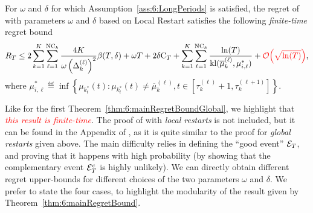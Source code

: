 \begin{theorem}\label{thm:6:mainRegretBound}
\begin{leftbar}[theorembar]  %
    For $\omega$ and $\delta$ for which Assumption~\ref{ass:6:LongPeriods} is satisfied, the regret of \GLRklUCB{} with parameters $\omega$ and $\delta$ based on Local Restart satisfies the following \emph{finite-time} regret bound
    \begin{equation}
        R_T \leq 2\sum_{k=1}^K\sum_{\ell=1}^{\text{NC}_k} \frac{4K}{\omega \left(\Delta_k^{(\ell)}\right)^2}\beta(T,\delta) +\omega T + 2 \delta \mathrm{C}_T  + \sum_{k=1}^K\sum_{\ell=1}^{\text{NC}_k} \frac{\ln(T)}{\mathrm{kl}(\overline{\mu}_k^{(\ell)},{\mu}^*_{i,\ell})} + \textcolor{red}{\mathop{}\mathopen{}\mathcal{O}\mathopen{}\left(\sqrt{\ln(T)}\right)},
    \end{equation}
    where ${\mu}^*_{i,\ell} \eqdef \inf \left\{ \mu_{k_t^*}(t) : \mu_{k_t^*}(t) \neq \overline{\mu}_k^{(\ell)}, t \in [\tau_k^{(\ell)}+1, \tau_k^{(\ell+1)}]\right\}$.
\end{leftbar}  %
\end{theorem}

Like for the first Theorem~\ref{thm:6:mainRegretBoundGlobal},
we highlight that \textcolor{red}{\emph{this result is finite-time}}.
The proof of \GLRklUCB{} with \emph{local restarts} is not included, but it can be found in the Appendix of \cite{Besson2019GLRT}, as it is quite similar to the proof for \emph{global restarts} given above. The main difficulty relies in defining the ``good event'' $\mathcal{E}_T$, and proving that it happens with high probability (by showing that the complementary event $\mathcal{E}_T^c$ is highly unlikely).
%
We can directly obtain different regret upper-bounds for different choices of the two parameters $\omega$ and $\delta$.
We prefer to state the four cases, to highlight the modularity of the result given by Theorem~\ref{thm:6:mainRegretBound}.

